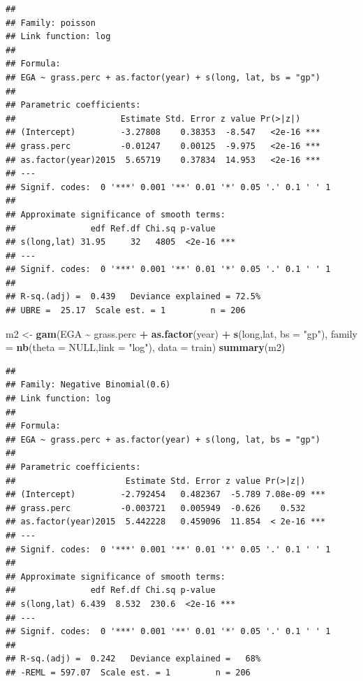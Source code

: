 \documentclass[
]{book}
\newenvironment{Shaded}{\begin{snugshade}}{\end{snugshade}}
\newcommand{\AttributeTok}[1]{\textcolor[rgb]{0.13,0.29,0.53}{#1}}
\newcommand{\ConstantTok}[1]{\textcolor[rgb]{0.56,0.35,0.01}{#1}}
\newcommand{\FunctionTok}[1]{\textcolor[rgb]{0.13,0.29,0.53}{\textbf{#1}}}
\newcommand{\NormalTok}[1]{#1}
\newcommand{\OtherTok}[1]{\textcolor[rgb]{0.56,0.35,0.01}{#1}}
\newcommand{\SpecialCharTok}[1]{\textcolor[rgb]{0.81,0.36,0.00}{\textbf{#1}}}
\newcommand{\StringTok}[1]{\textcolor[rgb]{0.31,0.60,0.02}{#1}}
\begin{document}
\begin{verbatim}
## 
## Family: poisson 
## Link function: log 
## 
## Formula:
## EGA ~ grass.perc + as.factor(year) + s(long, lat, bs = "gp")
## 
## Parametric coefficients:
##                     Estimate Std. Error z value Pr(>|z|)    
## (Intercept)         -3.27808    0.38353  -8.547   <2e-16 ***
## grass.perc          -0.01247    0.00125  -9.975   <2e-16 ***
## as.factor(year)2015  5.65719    0.37834  14.953   <2e-16 ***
## ---
## Signif. codes:  0 '***' 0.001 '**' 0.01 '*' 0.05 '.' 0.1 ' ' 1
## 
## Approximate significance of smooth terms:
##               edf Ref.df Chi.sq p-value    
## s(long,lat) 31.95     32   4805  <2e-16 ***
## ---
## Signif. codes:  0 '***' 0.001 '**' 0.01 '*' 0.05 '.' 0.1 ' ' 1
## 
## R-sq.(adj) =  0.439   Deviance explained = 72.5%
## UBRE =  25.17  Scale est. = 1         n = 206
\end{verbatim}

\begin{Shaded}
\begin{Highlighting}[]
\NormalTok{m2 }\OtherTok{\textless{}{-}} \FunctionTok{gam}\NormalTok{(EGA }\SpecialCharTok{\textasciitilde{}}\NormalTok{ grass.perc }\SpecialCharTok{+} \FunctionTok{as.factor}\NormalTok{(year) }\SpecialCharTok{+} \FunctionTok{s}\NormalTok{(long,lat, }\AttributeTok{bs =} \StringTok{"gp"}\NormalTok{), }
          \AttributeTok{family =} \FunctionTok{nb}\NormalTok{(}\AttributeTok{theta =} \ConstantTok{NULL}\NormalTok{,}\AttributeTok{link =} \StringTok{"log"}\NormalTok{), }\AttributeTok{data =}\NormalTok{ train)}
\FunctionTok{summary}\NormalTok{(m2)}
\end{Highlighting}
\end{Shaded}

\begin{verbatim}
## 
## Family: Negative Binomial(0.6) 
## Link function: log 
## 
## Formula:
## EGA ~ grass.perc + as.factor(year) + s(long, lat, bs = "gp")
## 
## Parametric coefficients:
##                      Estimate Std. Error z value Pr(>|z|)    
## (Intercept)         -2.792454   0.482367  -5.789 7.08e-09 ***
## grass.perc          -0.003721   0.005949  -0.626    0.532    
## as.factor(year)2015  5.442228   0.459096  11.854  < 2e-16 ***
## ---
## Signif. codes:  0 '***' 0.001 '**' 0.01 '*' 0.05 '.' 0.1 ' ' 1
## 
## Approximate significance of smooth terms:
##               edf Ref.df Chi.sq p-value    
## s(long,lat) 6.439  8.532  230.6  <2e-16 ***
## ---
## Signif. codes:  0 '***' 0.001 '**' 0.01 '*' 0.05 '.' 0.1 ' ' 1
## 
## R-sq.(adj) =  0.242   Deviance explained =   68%
## -REML = 597.07  Scale est. = 1         n = 206
\end{verbatim}
\end{document}
